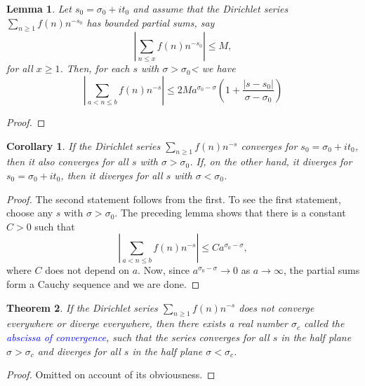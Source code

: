 \documentclass[12pt]{article}
\theoremstyle{thmstyle}
\newtheorem{theorem}{Theorem}[section]
\newtheorem{lemma}[theorem]{Lemma}
\theoremstyle{defstyle}
\newtheorem*{corollary}{Corollary}
\newcommand{\define}[1]{\textcolor{blue}{\textit{#1}}}
\renewcommand{\le}{\leqslant}
\renewcommand{\ge}{\geqslant}
\begin{document}
\begin{lemma}
    Let $s_0 = \sigma_0 + it_0$ and assume that the Dirichlet series $\sum_{n\ge 1} f(n)n^{-s_0}$ has bounded partial sums, say 
    \begin{equation*}
        \left|\sum_{n\le x} f(n)n^{-s_0}\right|\le M,
    \end{equation*}
    for all $x\ge 1$. Then, for each $s$ with $\sigma > \sigma_0$< we have 
    \begin{equation*}
        \left|\sum_{a < n \le b}f(n)n^{-s}\right|\le 2M a^{\sigma_0 - \sigma}\left(1 + \frac{|s - s_0|}{\sigma - \sigma_0}\right)
    \end{equation*}
\end{lemma}
\begin{proof}
\end{proof}

\begin{corollary}
    If the Dirichlet series $\sum_{n\ge 1}f(n)n^{-s}$ converges for $s_0 = \sigma_0 + it_0$, then it also converges for all $s$ with $\sigma > \sigma_0$. If, on the other hand, it diverges for $s_0 = \sigma_0 + it_0$, then it diverges for all $s$ with $\sigma < \sigma_0$.
\end{corollary}
\begin{proof}
    The second statement follows from the first. To see the first statement, choose any $s$ with $\sigma > \sigma_0$. The preceding lemma shows that there is a constant $C > 0$ such that 
    \begin{equation*}
        \left|\sum_{a < n\le b}f(n)n^{-s}\right|\le Ca^{\sigma_0 - \sigma},
    \end{equation*}
    where $C$ does not depend on $a$. Now, since $a^{\sigma_0 - \sigma}\to 0$ as $a\to\infty$, the partial sums form a Cauchy sequence and we are done.
\end{proof}

\begin{theorem}
    If the Dirichlet series $\sum_{n\ge 1} f(n)n^{-s}$ does not converge everywhere or diverge everywhere, then there exists a real number $\sigma_c$ called the \define{abscissa of convergence}, such that the series converges for all $s$ in the half plane $\sigma > \sigma_c$ and diverges for all $s$ in the half plane $\sigma < \sigma_c$.
\end{theorem}
\begin{proof}
    Omitted on account of its obviousness.
\end{proof}
\end{document}
